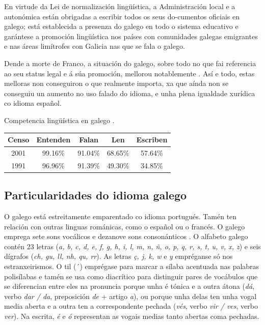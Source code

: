 \begin{multicols}{2}
En virtude da Lei de normalización lingüística, a Administración local e a autonómica están obrigadas a escribir todos os seus do-cumentos oficiais en galego; está establecida a presenza do galego en todo o sistema educativo e garántese a promoción lingüística nos países con comunidades galegas emigrantes e nas áreas limítrofes con Galicia nas que se fala o galego. 

Dende a morte de Franco, a situación do galego, sobre todo no que fai referencia ao seu status legal e á súa promoción, mellorou notablemente \cite{GAL-Nota7}. Así e todo, estas melloras non conseguiron o que realmente importa, xa que aínda non se conseguiu un aumento no uso falado do idioma, e unha plena igualdade xurídica co idioma español.

Competencia lingüística en galego \cite{GAL-Nota8}.

\begin{tabular}{|c|c|c|c|c|}
\hline  Censo & Entenden & Falan & Len & Escriben\\ 
\hline  2001 & 99.16\% & 91.04\%& 68.65\%& 57.64\%\\ 
\hline  1991 & 96.96\% & 91.39\%& 49.30\%& 34.85\%\\ 
\hline 
\end{tabular} 


\subsection{Particularidades do idioma galego}

   O galego está estreitamente emparentado co idioma portugués. Tamén ten relación con outras linguas románicas, como o español ou o francés. O galego emprega sete sons vocálicos e dezanove sons consonánticos \cite{GAL-Nota9}. O alfabeto galego contén 23 letras (\textit{a, b, c, d, e, f, g, h, i, l, m, n, ñ, o, p, q, r, s, t, u, v, x, z}) e seis dígrafos (\textit{ch, gu, ll, nh, qu, rr}). As letras \textit{ç, j, k, w} e \textit{y} empréganse só nos estranxeirismos. O til (´) emprégase para marcar a sílaba acentuada nas palabras polisílabas e tamén se usa como diacrítico para distinguir pares de vocábulos que se diferencian entre eles na pronuncia porque unha é tónica e a outra átona (\textit{dá}, verbo \textit{dar / da}, preposición \textit{de} + artigo \textit{a}), ou porque unha delas ten unha vogal media aberta e a outra ten a correspondente pechada (\textit{vés}, verbo \textit{vir / ves}, verbo \textit{ver}). Na escrita, \textit{é} e \textit{ó} representan as vogais medias tanto abertas coma pechadas.



\end{multicols}

